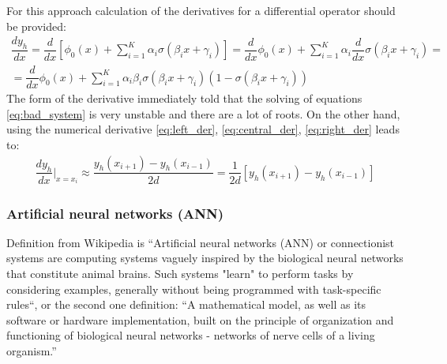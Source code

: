 For this approach calculation of the derivatives for a differential operator should be provided:
\begin{equation}
	\label{eq:bad_system}
	\begin{multlined}
		\dfrac{d y_h}{d x} = \dfrac{d}{d x} \left [ \phi_0(x) + \sum_{i = 1}^K \alpha_i \sigma(\beta_i x + \gamma_i) \right ] = \dfrac{d}{d x} \phi_0(x) + \sum_{i = 1}^K \alpha_i \dfrac{d}{d x} \sigma(\beta_i x + \gamma_i) = \\ = \dfrac{d}{d x} \phi_0(x) + \sum_{i = 1}^K \alpha_i \beta_i  \sigma(\beta_i x + \gamma_i) (1 - \sigma(\beta_i x + \gamma_i))
	\end{multlined}
\end{equation}
The form of the derivative immediately told that the solving of equations \eqref{eq:bad_system} is very unstable and there are a lot of roots. On the other hand, using the numerical derivative \eqref{eq:left_der}, \eqref{eq:central_der}, \eqref{eq:right_der} leads to:
\begin{equation}
	\label{eq:good_system}
	\begin{multlined}
		\dfrac{d y_h}{d x} \Big|_{x = x_i} \approx \dfrac{y_h(x_{i + 1}) - y_h(x_{i - 1})}{2d} = \dfrac{1}{2d} \left [ y_h(x_{i + 1}) - y_h(x_{i - 1}) \right ]
	\end{multlined}
\end{equation}

\subsubsection{Artificial neural networks (ANN)}	
Definition from Wikipedia is ``Artificial neural networks (ANN) or connectionist systems are computing systems vaguely inspired by the biological neural networks that constitute animal brains. Such systems "learn" to perform tasks by considering examples, generally without being programmed with task-specific rules``, or the second one definition: ``A mathematical model, as well as its software or hardware implementation, built on the principle of organization and functioning of biological neural networks - networks of nerve cells of a living organism.''

